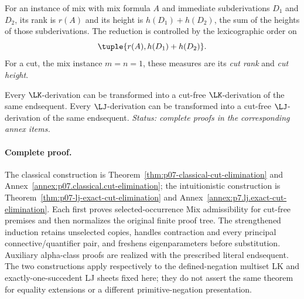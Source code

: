 For an instance of mix with mix formula \(A\) and immediate
subderivations \(D_1\) and \(D_2\), its rank is \(r(A)\) and its height
is \(h(D_1)+h(D_2)\), the sum of the heights of those subderivations.
The reduction is controlled by the lexicographic order on
\[
  \tuple{r(A),h(D_1)+h(D_2)}.
\]
For a cut, the mix instance \(m=n=1\), these measures are its \emph{cut
rank} and \emph{cut height}.

\begin{theorem}
\label{thm:p07-cut-elimination}
Every \(\LK\)-derivation can be transformed into a cut-free
\(\LK\)-derivation of the same endsequent.  Every \(\LJ\)-derivation can be
transformed into a cut-free \(\LJ\)-derivation of the same endsequent.
\textit{Status: complete proofs in the corresponding annex items.}
\end{theorem}

\paragraph{Complete proof.}
The classical construction is Theorem~\ref{thm:p07-classical-cut-elimination}
and Annex~\ref{annex:p07.classical.cut-elimination}; the intuitionistic
construction is Theorem~\ref{thm:p07-lj-exact-cut-elimination} and
Annex~\ref{annex:p7.lj.exact-cut-elimination}. Each first proves selected-occurrence
Mix admissibility for cut-free premises and then normalizes the original
finite proof tree. The strengthened induction retains unselected copies,
handles contraction and every principal connective/quantifier pair, and
freshens eigenparameters before substitution. Auxiliary alpha-class proofs
are realized with the prescribed literal endsequent. The two constructions
apply respectively to the defined-negation multiset LK and exactly-one-succedent
LJ sheets fixed here; they do not assert the same theorem for equality extensions
or a different primitive-negation presentation.
